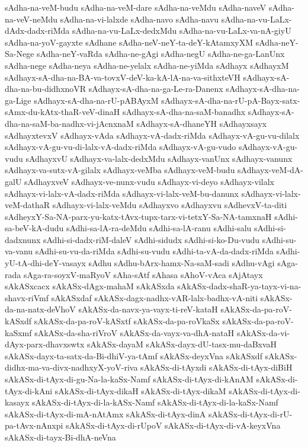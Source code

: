 {sAdha-na-veM-budu
sAdha-na-veM-dare
sAdha-na-veMdu
sAdha-naveV
sAdha-na-veV-neMdu
sAdha-na-vi-lalxde
sAdha-navo
sAdha-navu
sAdha-na-vu-LaLx-dAdx-dadx-riMda
sAdha-na-vu-LaLx-dedxMdu
sAdha-na-vu-LaLx-va-nA-giyU
sAdha-na-yoV-gayxte
sAdhane
sAdha-neV-neY-ta-deY-kAtamxyXM
sAdha-neY-Sa-Nege
sAdha-neY-vaRda
sAdha-ne-gAgi
sAdha-negU
sAdha-ne-ga-LanUnx
sAdha-nege
sAdha-neya
sAdha-ne-yelalx
sAdha-ne-yiMda
sAdhayx
sAdhayxM
sAdhayx-sA-dha-na-BA-va-tovxV-deV-ka-kA-lA-na-va-sithxteVH
sAdhayx-sA-dha-na-bu-didhxnoVR
sAdhayx-sA-dha-na-ga-Le-ra-Danenx
sAdhayx-sA-dha-na-ga-Lige
sAdhayx-sA-dha-na-rU-pABAyxM
sAdhayx-sA-dha-na-rU-pA-Bayx-satx-sAmx-du-kAtx-thaR-veV-dinaH
sAdhayx-sA-dha-na-saM-banadhx
sAdhayx-sA-dha-na-saM-ba-nadhx-vi-jAcnxnaM
sAdhayx-sA-dhaneYH
sAdhayxsayx
sAdhayxtevxV
sAdhayx-vAda
sAdhayx-vA-dadx-riMda
sAdhayx-vA-gu-vu-dilalx
sAdhayx-vA-gu-vu-di-lalx-vA-dadx-riMda
sAdhayx-vA-gu-vudo
sAdhayx-vA-gu-vudu
sAdhayxvU
sAdhayx-va-lalx-dedxMdu
sAdhayx-vanUnx
sAdhayx-vanunx
sAdhayx-va-sutx-vA-gilalx
sAdhayx-veMba
sAdhayx-veM-budu
sAdhayx-veM-dA-galU
sAdhayxveV
sAdhayx-ve-nunx-vudu
sAdhayx-vi-deyo
sAdhayx-vilalx
sAdhayx-vi-lalx-vA-dadx-riMda
sAdhayx-vi-lalx-veM-bu-danunx
sAdhayx-vi-lalx-veM-dathaR
sAdhayx-vi-lalx-veMdu
sAdhayxvo
sAdhayxvu
sAdhevxV-ta-diti
sAdheyxY-Sa-NA-parx-yu-katx-tAvx-tupx-tarx-vi-tetxY-Sa-NA-tamxnaH
sAdhi-sa-beV-kA-dudu
sAdhi-sa-lA-ra-deMdu
sAdhi-sa-lA-ranu
sAdhi-salu
sAdhi-si-dadxnunx
sAdhi-si-dadx-riM-daleV
sAdhi-sidudx
sAdhi-si-ko-Du-vudu
sAdhi-su-va-vanu
sAdhi-su-vu-da-riMda
sAdhi-su-vudu
sAdhi-ta-vA-da-dadx-riMda
sAdhi-yU-tA-dhi-deY-vasayx
sAdhu
sAdhu-bArx-hamx-Na-saM-sadi
sAdhu-vAgi
sAga-rada
sAga-ra-soyxV-maRyoV
sAha-sAtf
sAhasa
sAhoV-vAca
sAjAtayx
sAkASxcacx
sAkASx-dAgx-mahaM
sAkASxda
sAkASx-dadx-shaR-ya-tayx-vi-na-shavx-riVmf
sAkASxdaf
sAkASx-dagx-nadhx-vAR-lalx-badhx-vA-niti
sAkASx-da-na-natx-deVhoV
sAkASx-da-navx-ya-vayx-ti-reV-kataH
sAkASx-da-pa-roV-kASxdf
sAkASx-da-pa-roV-kASxtf
sAkASx-da-pa-roVkaSx
sAkASx-da-pa-roV-kaSxmf
sAkASx-da-sha-riVroV
sAkASx-da-vayx-va-dhA-nataH
sAkASx-da-vi-dAyx-parx-dhavxswtx
sAkASx-dayaM
sAkASx-dayx-dU-tasx-mu-daBxvaH
sAkASx-dayx-ta-satx-da-Bi-dhiV-ya-tAmf
sAkASx-deyxVna
sAkASxdf
sAkASx-didhx-ma-va-divx-nadhxyX-yoV-riva
sAkASx-di-tAyxdi
sAkASx-di-tAyx-diBiH
sAkASx-di-tAyx-di-gu-Na-la-kaSx-Namf
sAkASx-di-tAyx-di-kAnAM
sAkASx-di-tAyx-di-kAni
sAkASx-di-tAyx-dikaH
sAkASx-di-tAyx-dikaM
sAkASx-di-tAyx-di-kasayx
sAkASx-di-tAyx-di-la-kASx-Namf
sAkASx-di-tAyx-di-la-kaSx-Namf
sAkASx-di-tAyx-di-mA-nAtAmx
sAkASx-di-tAyx-dinA
sAkASx-di-tAyx-di-rU-pa-tAvx-nAnxpi
sAkASx-di-tAyx-di-rUpoV
sAkASx-di-tAyx-di-vA-keyxVna
sAkASx-di-tayx-Bi-dhA-neVna
}
